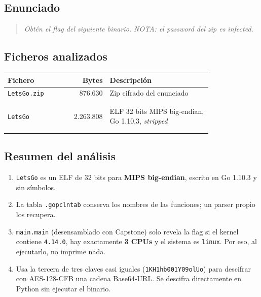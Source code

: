 \documentclass[11pt,a4paper]{article}
\begin{document}
\subsection{Enunciado}
\begin{quote}\itshape Obtén el flag del siguiente binario. NOTA: el password del zip es infected.\end{quote}

\subsection{Ficheros analizados}
\begin{longtable}{@{}L{0.30\linewidth}r L{0.50\linewidth}@{}}
\toprule \textbf{Fichero} & \textbf{Bytes} & \textbf{Descripción} \\ \midrule \endhead
\texttt{LetsGo.zip} & 876.630 & Zip cifrado del enunciado \\ \nopagebreak
{} \\ \nopagebreak
{} \\ \midrule
\texttt{LetsGo} & 2.263.808 & ELF 32 bits MIPS big-endian, Go 1.10.3, \emph{stripped} \\ \nopagebreak
{} \\ \nopagebreak
{} \\ \midrule
\end{longtable}

\subsection{Resumen del análisis}
\begin{enumerate}
  \item \texttt{LetsGo} es un ELF de 32 bits para \textbf{MIPS big-endian}, escrito en Go 1.10.3 y sin símbolos.
  \item La tabla \texttt{.gopclntab} conserva los nombres de las funciones; un parser propio los recupera.
  \item \texttt{main.main} (desensamblado con Capstone) solo revela la flag si el kernel contiene \texttt{4.14.0}, hay
        exactamente \textbf{3 CPUs} y el sistema es \texttt{linux}. Por eso, al ejecutarlo, no imprime nada.
  \item Usa la tercera de tres claves casi iguales (\texttt{1KH1hb001Y09olUo}) para descifrar con AES-128-CFB una
        cadena Base64-URL. Se descifra directamente en Python sin ejecutar el binario.
\end{enumerate}
\end{document}
